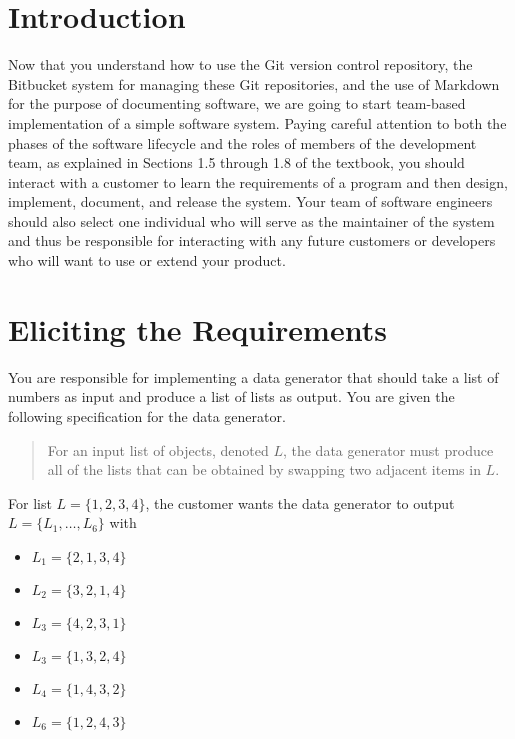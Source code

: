 

\usepackage[compact]{titlesec}



\section*{Introduction}

Now that you understand how to use the Git version control repository, the Bitbucket system for managing these Git
repositories, and the use of Markdown for the purpose of documenting software, we are going to start team-based
implementation of a simple software system. Paying careful attention to both the phases of the software lifecycle and
the roles of members of the development team, as explained in Sections 1.5 through 1.8 of the textbook, you should
interact with a customer to learn the requirements of a program and then design, implement, document, and release the
system. Your team of software engineers should also select one individual who will serve as the maintainer of the system
and thus be responsible for interacting with any future customers or developers who will want to use or extend your
product.

\section*{Eliciting the Requirements}

You are responsible for implementing a data generator that should take a list of numbers as input and produce a list of
lists as output.  You are given the following specification for the data generator.

\begin{quote}
For an input list of objects, denoted $L$, the data generator must produce all of the lists that can be obtained by swapping two
adjacent items in $L$.
\end{quote}

\noindent
For list $L = \{1, 2, 3, 4\}$, the customer wants the data generator to output $L=\{L_1, \ldots, L_6\}$ with

\begin{itemize}
    \item[] $L_1 = \{2, 1, 3, 4\}$
    \item[] $L_2 = \{3, 2, 1, 4\}$
    \item[] $L_3 = \{4, 2, 3, 1\}$
    \item[] $L_3 = \{1, 3, 2, 4\}$
    \item[] $L_4 = \{1, 4, 3, 2\}$
    \item[] $L_6 = \{1, 2, 4, 3\}$
\end{itemize}

